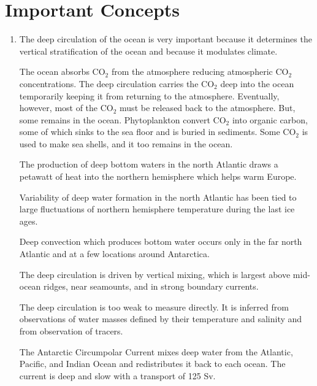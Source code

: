\section{Important Concepts}
\begin{enumerate}
\item
The deep circulation of the ocean is very important because it determines
the vertical stratification of the ocean and because it modulates climate.

\vitem
The ocean absorbs CO$_2$ from the atmosphere reducing atmospheric CO$_2$ concentrations.
The deep circulation carries the CO$_2$ deep into the ocean temporarily keeping it from
returning to the atmosphere. Eventually, however, most of the CO$_2$ must be released back to
the atmosphere. But, some remains in the ocean. Phytoplankton convert CO$_2$ into organic
carbon, some of which sinks to the sea floor and is buried in sediments. Some CO$_2$ is used to
make sea shells, and it too remains in the ocean.

\vitem
The production of deep bottom waters in the north Atlantic draws
a petawatt of heat into the northern hemisphere which helps
warm Europe.

\vitem
Variability of deep water formation in the north Atlantic has been tied
to large fluctuations of northern hemisphere temperature during the last ice
ages.

\vitem
Deep convection which produces bottom water occurs only in the far north Atlantic and at
a few locations around Antarctica.

\vitem
The deep circulation is driven by vertical mixing, which is
largest above mid-ocean ridges, near seamounts, and in strong boundary currents.

\vitem
The deep circulation is too weak to measure directly. It is inferred from
observations of water masses defined by their temperature and salinity
and from observation of tracers.

\vitem
The Antarctic Circumpolar Current mixes deep water from the Atlantic, Pacific, and Indian Ocean and redistributes it back to each ocean. The current is deep and slow with a
transport of 125 Sv.
\end{enumerate}



